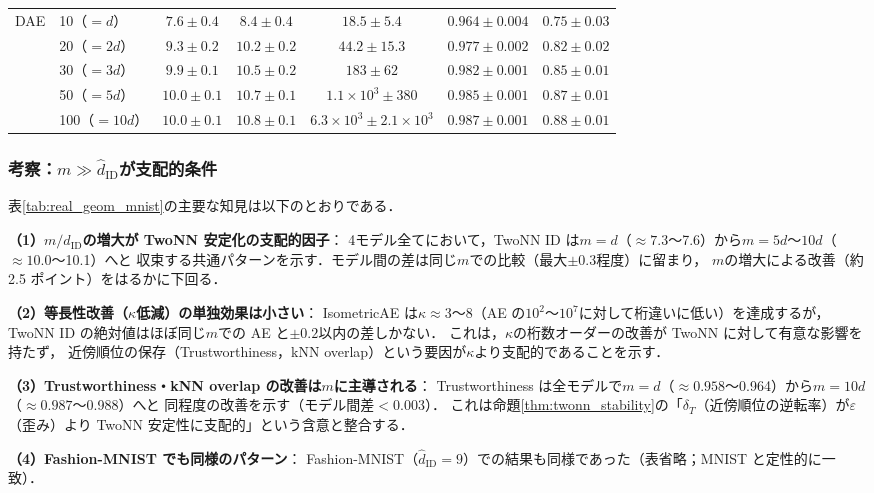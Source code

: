 \documentclass[11pt,a4paper]{jsarticle}
\newcommand{\kap}{\kappa}
\begin{document}
\begin{table}[H]
\begin{tabular}{llccccc}
\midrule
\multirow{5}{*}{DAE}
 & 10（$=d$）   & $7.6\pm0.4$ & $8.4\pm0.4$ & $18.5\pm5.4$ & $0.964\pm0.004$ & $0.75\pm0.03$ \\
 & 20（$=2d$）  & $9.3\pm0.2$ & $10.2\pm0.2$ & $44.2\pm15.3$ & $0.977\pm0.002$ & $0.82\pm0.02$ \\
 & 30（$=3d$）  & $9.9\pm0.1$ & $10.5\pm0.2$ & $183\pm62$ & $0.982\pm0.001$ & $0.85\pm0.01$ \\
 & 50（$=5d$）  & $10.0\pm0.1$ & $10.7\pm0.1$ & $1.1\times10^3\pm 380$ & $0.985\pm0.001$ & $0.87\pm0.01$ \\
 & 100（$=10d$）& $10.0\pm0.1$ & $10.8\pm0.1$ & $6.3\times10^3\pm 2.1\times10^3$ & $0.987\pm0.001$ & $0.88\pm0.01$ \\
\bottomrule
\end{tabular}
\end{table}

\subsubsection*{考察：$m \gg \hat{d}_\mathrm{ID}$が支配的条件}

表\ref{tab:real_geom_mnist}の主要な知見は以下のとおりである．

\textbf{（1）$m/\hat{d}_\mathrm{ID}$の増大が TwoNN 安定化の支配的因子}：
4モデル全てにおいて，TwoNN ID は$m=d$（$\approx 7.3$〜7.6）から$m=5d$〜$10d$（$\approx 10.0$〜10.1）へと
収束する共通パターンを示す．モデル間の差は同じ$m$での比較（最大$\pm0.3$程度）に留まり，
$m$の増大による改善（約 2.5 ポイント）をはるかに下回る．

\textbf{（2）等長性改善（$\kap$低減）の単独効果は小さい}：
IsometricAE は$\kap \approx 3$〜8（AE の$10^2$〜$10^7$に対して桁違いに低い）を達成するが，
TwoNN ID の絶対値はほぼ同じ$m$での AE と$\pm 0.2$以内の差しかない．
これは，$\kap$の桁数オーダーの改善が TwoNN に対して有意な影響を持たず，
近傍順位の保存（Trustworthiness，kNN overlap）という要因が$\kap$より支配的であることを示す．

\textbf{（3）Trustworthiness・kNN overlap の改善は$m$に主導される}：
Trustworthiness は全モデルで$m=d$（$\approx 0.958$〜0.964）から$m=10d$（$\approx 0.987$〜0.988）へと
同程度の改善を示す（モデル間差$< 0.003$）．
これは命題\ref{thm:twonn_stability}の「$\delta_T$（近傍順位の逆転率）が$\varepsilon$（歪み）より
TwoNN 安定性に支配的」という含意と整合する．

\textbf{（4）Fashion-MNIST でも同様のパターン}：
Fashion-MNIST（$\hat{d}_\mathrm{ID}=9$）での結果も同様であった（表省略；MNIST と定性的に一致）．
\end{document}
